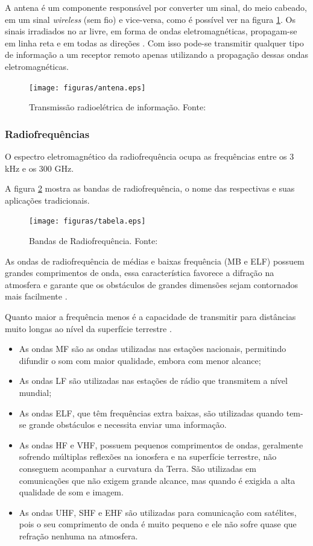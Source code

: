 A antena é um componente responsável por converter um sinal, do meio cabeado, em um sinal \textit{wireless} (sem fio) e vice-versa, 
como é possível
ver na figura \ref{fig:antena}. Os sinais irradiados no ar livre, em forma de ondas eletromagnéticas, propagam-se em linha reta e em 
todas as direções 
\cite{Rappaport2}. Com isso pode-se transmitir qualquer tipo de informação a um receptor remoto apenas utilizando a propagação dessas ondas 
eletromagnéticas.

\begin{figure}[H]
	\centering
	  \texttt{[image: figuras/antena.eps]}
	\caption{Transmissão radioelétrica de informação. Fonte: \cite{antena}}
	\label{fig:antena}
\end{figure}

\subsubsection{Radiofrequências}

O espectro eletromagnético da radiofrequência ocupa as frequências entre os 3 kHz e os 300 GHz. 

A figura \ref{fig:tabelafre} mostra as bandas de radiofrequência, o nome das respectivas e suas aplicações tradicionais.

\begin{figure}[H]
	\centering
	  \texttt{[image: figuras/tabela.eps]}
	\caption{Bandas de Radiofrequência. Fonte: \cite{tabela}}
	\label{fig:tabelafre}
\end{figure}

As ondas de radiofrequência de médias e baixas frequência (MB e ELF) possuem grandes comprimentos de onda, essa característica favorece a 
difração na atmosfera e garante que os obstáculos de grandes dimensões sejam contornados mais facilmente \cite{Rappaport2}.

Quanto maior a frequência menos é a capacidade de transmitir para distâncias muito longas ao nível da superfície terrestre \cite{VALLE1}. 

\begin{itemize}
	\item As ondas MF são as ondas utilizadas nas estações nacionais, permitindo difundir o som com maior qualidade, embora com menor alcance;
	\item As ondas LF são utilizadas nas estações de rádio que transmitem a nível mundial;
	\item As ondas ELF, que têm frequências extra baixas, são utilizadas quando tem-se grande obstáculos e necessita enviar uma informação. 
	\item As ondas HF e VHF, possuem pequenos comprimentos de ondas, geralmente sofrendo múltiplas reflexões na ionosfera e na superfície terrestre, não conseguem acompanhar a curvatura da Terra. São utilizadas em comunicações que não exigem grande alcance, mas quando é exigida a alta qualidade de som e imagem.
	\item As ondas UHF, SHF e EHF são utilizadas para comunicação com satélites, pois o seu comprimento de onda é muito pequeno e ele não sofre quase que refração nenhuma na atmosfera. 
\end{itemize} 


